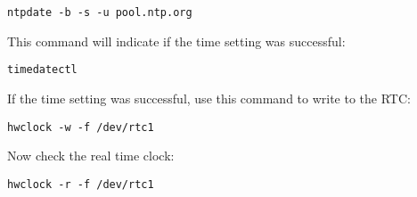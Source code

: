 \begin{verbatim}
ntpdate -b -s -u pool.ntp.org
\end{verbatim}

This command will indicate if the time setting was successful:

\begin{verbatim}
timedatectl
\end{verbatim}

If the time setting was successful, use this command to write to the RTC:

\begin{verbatim}
hwclock -w -f /dev/rtc1
\end{verbatim}

Now check the real time clock:

\begin{verbatim}
hwclock -r -f /dev/rtc1
\end{verbatim}